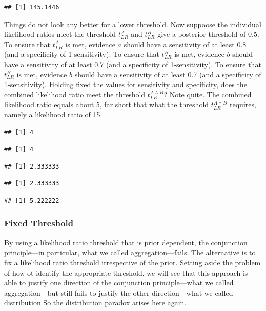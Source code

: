 \documentclass[10pt,dvipsnames,enabledeprecatedfontcommands]{scrartcl}
\begin{document}
\begin{verbatim}
## [1] 145.1446
\end{verbatim}

Things do not look any better for a lower threshold. Now suppoose the
individual likelihood ratios meet the threshold \(t_{LR}^{A}\) and
\(t_{LR}^{B}\) give a posterior threshold of \(0.5\). To ensure that
\(t_{LR}^{A}\) is met, evidence \(a\) should have a sensitivity of at
least 0.8 (and a specificity of 1-sensitivity). To ensure that
\(t_{LR}^{B}\) is met, evidence \(b\) should have a sensitivity of at
least 0.7 (and a specificity of 1-sensitivity). To ensure that
\(t_{LR}^{B}\) is met, evidence \(b\) should have a sensitivity of at
least 0.7 (and a specificity of 1-sensitivity). Holding fixed the values
for sensitivity and specificity, does the combined likelihood ratio meet
the threshold \(t_{LR}^{A\wedge B}\)? Note quite. The combined
likelihood ratio equals about 5, far short that what the threshold
\(t^{A\wedge B}_{LR}\) requires, namely a likelihood ratio of 15.

\begin{verbatim}
## [1] 4
\end{verbatim}

\begin{verbatim}
## [1] 4
\end{verbatim}

\begin{verbatim}
## [1] 2.333333
\end{verbatim}

\begin{verbatim}
## [1] 2.333333
\end{verbatim}

\begin{verbatim}
## [1] 5.222222
\end{verbatim}

\subsubsection{Fixed Threshold}\label{fixed-threshold-1}

By using a likelihood ratio threshold that is prior dependent, the
conjunction principle---in particular, what we called
aggregation---fails. The alternative is to fix a likelihood ratio
threshold irrespective of the prior. Setting aside the problem of how ot
identify the appropriate threshold, we will see that this approach is
able to justify one direction of the conjunction principle---what we
called aggregation---but still fails to justify the other
direction---what we called distribution So the distribution paradox
arises here again.
\end{document}
